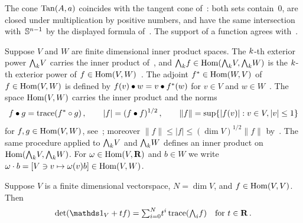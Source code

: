 \begin{remark}
    \label{rem:2.1}
    The cone $\operatorname{Tan}(A,a)$ coincides with the tangent cone of~\cite[3.1.21]{Federer1969}: both
    sets contain~$0$, are closed under multiplication by positive numbers, and have the same
    intersection with~$\mathbb{S}^{n-1}$ by the displayed formula of~\cite[3.1.21]{Federer1969}.
    The support of a function agrees with~\cite[2.5.13]{Federer1969}.
\end{remark}

\begin{definition}
    \label{al:2.2}
    Suppose $V$ and $W$ are finite dimensional inner product spaces. The $k$-th exterior
    power ${\textstyle\boldsymbol{\bigwedge}}_{{k}} V$ carries the inner product of~\cite[1.7.5]{Federer1969}, and
    ${\textstyle\boldsymbol{\bigwedge}}_{{k}} f \in \operatorname{Hom}({\textstyle\boldsymbol{\bigwedge}}_{{k}} V, {\textstyle\boldsymbol{\bigwedge}}_{{k}} W)$ is the $k$-th
    exterior power of $f \in \operatorname{Hom}(V,W)$~\cite[1.3.1]{Federer1969}. The adjoint $f^{*}
    \in \operatorname{Hom}(W,V)$ of $f \in \operatorname{Hom}(V,W)$ is defined by $f(v) \bullet w = v \bullet
    f^{*}(w)$ for $v \in V$ and $w \in W$~\cite[1.7.4]{Federer1969}. The space
    $\operatorname{Hom}(V,W)$ carries the inner product and the norms
    \begin{displaymath}
        f \bullet g = \operatorname{trace} (f^{*} \circ g) \,, \qquad |f| = (f \bullet f)^{1/2} \,,
        \qquad \|f\| = \sup \{ |f(v)| : v \in V, |v| \le 1 \}
    \end{displaymath}
    for $f, g \in \operatorname{Hom}(V,W)$, see~\cite[1.7.6, 1.7.9]{Federer1969}; moreover $\|f\| \le |f| \le
    (\dim V)^{1/2} \|f\|$ by~\cite[1.7.9]{Federer1969}. The same procedure applied to
    ${\textstyle\boldsymbol{\bigwedge}}_{{k}} V$ and ${\textstyle\boldsymbol{\bigwedge}}_{{k}} W$ defines an inner product on
    $\operatorname{Hom}({\textstyle\boldsymbol{\bigwedge}}_{{k}} V, {\textstyle\boldsymbol{\bigwedge}}_{{k}} W)$. For $\omega \in \operatorname{Hom}(V,\mathbf{R})$ and $b \in W$
    we write $\omega \cdot b = [ V \ni v \mapsto \omega(v) b ] \in \operatorname{Hom}(V,W)$.
\end{definition}

\begin{lemma}
    \label{al:2.2(1)}
    Suppose $V$ is a finite dimensional vectorspace, $N = \dim V$, and $f \in \operatorname{Hom}(V,V)$. Then
    \begin{displaymath}
        \det (\id{V} + t f) = \textsum{i=0}{N} t^i \trace (\extpower{i} f)
        \quad \text{for $t \in \R$} \,.
    \end{displaymath}
\end{lemma}

